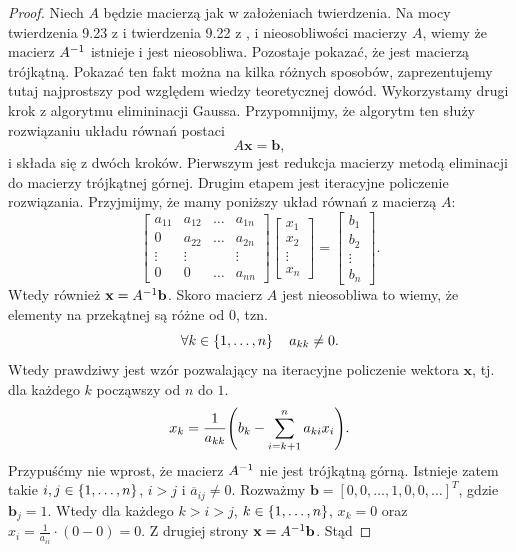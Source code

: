 \documentclass[12pt,a4paper]{report}
\newcommand{\vr}[1]{\mathbf{#1}}
\newcommand{\mx}[1]{{#1}}
\begin{document}
\begin{proof}
Niech $\mx{A}$ będzie macierzą jak w założeniach twierdzenia.
Na mocy twierdzenia 9.23 z \citep{poreda11} i twierdzenia 9.22 z \citep{poreda11}, i nieosobliwości macierzy $\mx{A}$, wiemy że macierz $\inverse{\mx{A}} $ istnieje i jest nieosobliwa. Pozostaje pokazać, że jest macierzą trójkątną. Pokazać ten fakt można na kilka różnych sposobów, zaprezentujemy tutaj najprostszy pod względem wiedzy teoretycznej dowód.
Wykorzystamy drugi krok z algorytmu elimininacji Gaussa. Przypomnijmy, że algorytm ten służy rozwiązaniu układu równań postaci 
$$
\mx{A} \vr{x} = \vr{b},
$$
i składa się z dwóch kroków. Pierwszym jest redukcja macierzy metodą eliminacji do macierzy trójkątnej górnej. Drugim etapem jest iteracyjne policzenie rozwiązania. Przyjmijmy, że mamy poniższy układ równań z macierzą $\mx{A}$:
$$
\begin{bmatrix}
a_{11} & a_{12} & \ldots & a_{1n} \\
0 & a_{22} & \ldots & a_{2n} \\
\vdots & \vdots & & \vdots\\
0 & 0 & \ldots & a_{nn}
\end{bmatrix}
\begin{bmatrix}
x_1 \\ x_2 \\ \vdots \\ x_n
\end{bmatrix}
=
\begin{bmatrix}
b_1 \\ b_2 \\ \vdots \\ b_n
\end{bmatrix}.
$$
Wtedy również $\vr{x} = \inverse{\mx{A}}\vr{b}$. Skoro macierz $\mx{A}$ jest nieosobliwa to wiemy, że elementy na przekątnej są różne od $0$, tzn.
$$
\forall k \in \left\lbrace {1, \ldots, n} \right\rbrace \quad a_{kk} \neq 0.
$$
Wtedy prawdziwy jest wzór pozwalający na iteracyjne policzenie wektora $\vr{x}$, tj. dla każdego $k$ począwszy od $n$ do $1$.
\begin{equation}
x_k = \frac{1}{a_{kk}} \bracket{b_k - \sum_{i=k+1}^{n} a_{ki} x_{i}}.
\end{equation}
Przypuśćmy nie wprost, że macierz $\inverse{\mx{A}}$ nie jest trójkątną górną. Istnieje zatem takie $i,j \in \left\lbrace {1, \ldots, n} \right\rbrace$, $i > j$ i $\overline{a}_{ij} \neq 0 $. Rozważmy $\vr{b}= [0,0, \ldots, 1,0,0, \ldots]^{T}$, gdzie $\vr{b}_{j} = 1$. Wtedy dla każdego $k>i>j$, $k \in \left\lbrace {1, \ldots, n} \right\rbrace$, $x_{k} = 0$ oraz $x_{i} = \frac{1}{a_{ii}} \cdot(0 - 0 ) = 0$. Z drugiej strony $\vr{x} = \inverse{\mx{A}} \vr{b}$. Stąd 

\end{proof}
\end{document}
